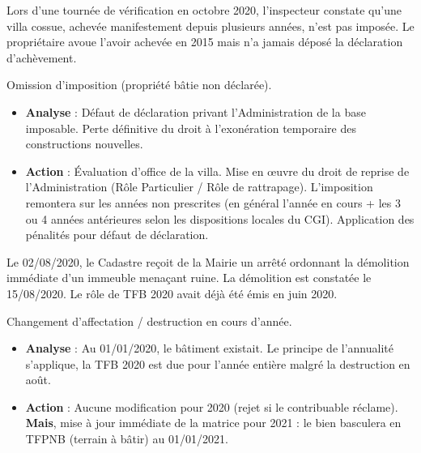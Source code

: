 \documentclass[a4paper, 11pt]{exam}
\begin{document}
\begin{questions}
		\question Lors d'une tournée de vérification en octobre 2020, l'inspecteur constate qu'une villa cossue, achevée manifestement depuis plusieurs années, n'est pas imposée. Le propriétaire avoue l'avoir achevée en 2015 mais n'a jamais déposé la déclaration d'achèvement.
		\begin{solution}
			Omission d'imposition (propriété bâtie non déclarée).
			\begin{itemize}
				\item \textbf{Analyse} : Défaut de déclaration privant l'Administration de la base imposable. Perte définitive du droit à l'exonération temporaire des constructions nouvelles.
				\item \textbf{Action} : Évaluation d'office de la villa. Mise en œuvre du droit de reprise de l'Administration (Rôle Particulier / Rôle de rattrapage). L'imposition remontera sur les années non prescrites (en général l'année en cours + les 3 ou 4 années antérieures selon les dispositions locales du CGI). Application des pénalités pour défaut de déclaration.
			\end{itemize}
		\end{solution}
		
		\question Le 02/08/2020, le Cadastre reçoit de la Mairie un arrêté ordonnant la démolition immédiate d'un immeuble menaçant ruine. La démolition est constatée le 15/08/2020. Le rôle de TFB 2020 avait déjà été émis en juin 2020.
		\begin{solution}
			Changement d'affectation / destruction en cours d'année.
			\begin{itemize}
				\item \textbf{Analyse} : Au 01/01/2020, le bâtiment existait. Le principe de l'annualité s'applique, la TFB 2020 est due pour l'année entière malgré la destruction en août.
				\item \textbf{Action} : Aucune modification pour 2020 (rejet si le contribuable réclame). \textbf{Mais}, mise à jour immédiate de la matrice pour 2021 : le bien basculera en TFPNB (terrain à bâtir) au 01/01/2021.
			\end{itemize}
		\end{solution}
		
		

\end{questions}
\end{document}
